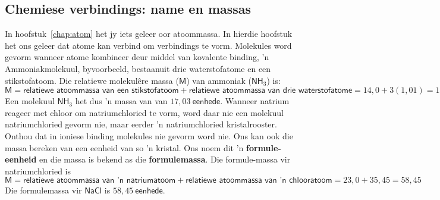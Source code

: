             \subsection*{Chemiese verbindings: name en massas}
            \nopagebreak
\label{m38689*uid97124}In hoofstuk~\ref{chap:atom} het jy iets geleer oor atoommassa. In hierdie hoofstuk het ons geleer dat atome kan verbind om verbindings te vorm. Molekules word gevorm wanneer atome kombineer deur middel van kovalente binding, 'n Ammoniakmolekuul, byvoorbeeld, bestaan ​​uit drie waterstofatome en een stikstofatoom. Die relatiewe molekul\^{e}re massa ($\textsf{M}$) van ammoniak ($\textsf{NH}_{3}$) is:\\
\begin{equation*}
 \textsf{M} = \textsf{relatiewe atoommassa van een stikstofatoom} + \textsf{relatiewe atoommassa van drie waterstofatome}
= 14,0 + 3(1,01) 
= 17,03
\end{equation*}
Een molekuul $\textsf{NH}_{3}$ het dus  'n massa van van $17,03~\textsf{eenhede}$. Wanneer natrium reageer met chloor om natriumchloried te vorm, word daar nie een molekuul natriumchloried gevorm nie, maar eerder 'n natriumchloried kristalrooster. Onthou dat in ioniese binding molekules nie gevorm word nie. Ons kan ook die massa bereken van een eenheid van so 'n kristal. Ons noem dit 'n \textbf{formule-eenheid} en die massa is bekend as die \textbf{formulemassa}. Die formule-massa vir natriumchloried is
 \begin{equation*}
 \textsf{M} = \textsf{relatiewe atoommassa van 'n natriumatoom} + \textsf{relatiewe atoommassa van 'n chlooratoom}
= 23,0 + 35,45 
= 58,45
\end{equation*} 
Die formulemassa vir $\textsf{NaCl}$ is $58,45~\textsf{eenhede}$.
      \label{m38689*secfhsst!!!underscore!!!id822}

